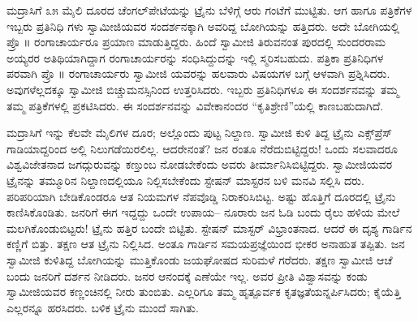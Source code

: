 ಮದ್ರಾಸಿಗೆ ೩೫ ಮೈಲಿ ದೂರದ ಚೆಂಗಲ್​ಪೇಟೆಯನ್ನು ಟ್ರೈನು ಬೆಳಿಗ್ಗೆ ಆರು ಗಂಟೆಗೆ ಮುಟ್ಟಿತು. ಆಗ  ಹಾಗೂ  ಪತ್ರಿಕೆಗಳ ಇಬ್ಬರು ಪ್ರತಿನಿಧಿ ಗಳು ಸ್ವಾಮೀಜಿಯವರ ಸಂದರ್ಶನಕ್ಕಾಗಿ ಅವರಿದ್ದ ಬೋಗಿಯನ್ನು ಹತ್ತಿದರು. ಅದೇ ಬೋಗಿಯಲ್ಲಿ ಪ್ರೊ ॥ ರಂಗಾಚಾರ್ಯರೂ ಪ್ರಯಾಣ ಮಾಡುತ್ತಿದ್ದರು. ಹಿಂದೆ ಸ್ವಾಮೀಜಿ ತಿರುವನಂತ ಪುರದಲ್ಲಿ ಸುಂದರರಾಮ ಅಯ್ಯರರ ಅತಿಥಿಯಾಗಿದ್ದಾಗ ರಂಗಾಚಾರ್ಯರನ್ನು ಸಂಧಿಸಿದ್ದುದನ್ನು ಇಲ್ಲಿ ಸ್ಮರಿಸಬಹುದು. ಪತ್ರಿಕಾ ಪ್ರತಿನಿಧಿಗಳ ಪರವಾಗಿ ಪ್ರೊ ॥ ರಂಗಾಚಾರ್ಯರು ಸ್ವಾಮೀಜಿ ಯವರನ್ನು ಹಲವಾರು ವಿಷಯಗಳ ಬಗ್ಗೆ ಆಳವಾಗಿ ಪ್ರಶ್ನಿಸಿದರು. ಅವುಗಳೆಲ್ಲದಕ್ಕೂ ಸ್ವಾಮೀಜಿ ಬಿಚ್ಚುಮನಸ್ಸಿನಿಂದ ಉತ್ತರಿಸಿದರು. ಇಬ್ಬರು ಪ್ರತಿನಿಧಿಗಳೂ ಈ ಸಂದರ್ಶನವನ್ನು ತಮ್ಮ ತಮ್ಮ ಪತ್ರಿಕೆಗಳಲ್ಲಿ ಪ್ರಕಟಿಸಿದರು. ಈ ಸಂದರ್ಶನವನ್ನು ವಿವೇಕಾನಂದರ “ಕೃತಿಶ್ರೇಣಿ”ಯಲ್ಲಿ ಕಾಣಬಹುದಾಗಿದೆ.

ಮದ್ರಾಸಿಗೆ ಇನ್ನು ಕೆಲವೇ ಮೈಲಿಗಳ ದೂರ; ಅಲ್ಲೊಂದು ಪುಟ್ಟ ನಿಲ್ದಾಣ. ಸ್ವಾಮೀಜಿ ಕುಳಿ ತಿದ್ದ ಟ್ರೈನು ಎಕ್ಸ್​ಪ್ರೆಸ್ ಗಾಡಿಯಾದ್ದರಿಂದ ಅಲ್ಲಿ ನಿಲುಗಡೆಯಿರಲಿಲ್ಲ. ಆದರೇನಂತೆ? ಜನ ರಂತೂ ನೆರೆದುಬಿಟ್ಟಿದ್ದರು! ಒಂದು ಸಲವಾದರೂ ವಿಶ್ವವಿಜೇತನಾದ ಜಗದ್ಗುರುವನ್ನು ಕಣ್ತುಂಬ ನೋಡಬೇಕೆಂದು ಅವರು ತೀರ್ಮಾನಿಸಿಬಿಟ್ಟಿದ್ದರು. ಸ್ವಾಮೀಜಿಯವರ ಟ್ರೈನನ್ನು ತಮ್ಮೂರಿನ ನಿಲ್ದಾಣದಲ್ಲಿಯೂ ನಿಲ್ಲಿಸಬೇಕೆಂದು ಸ್ಟೇಷನ್ ಮಾಸ್ಟರನ ಬಳಿ ಮನವಿ ಸಲ್ಲಿಸಿ ದರು. ಪರಿಪರಿಯಾಗಿ ಬೇಡಿಕೊಂಡರೂ ಆತ ನಿಯಮಗಳ ನೆಪವೊಡ್ಡಿ ನಿರಾಕರಿಸಿಬಿಟ್ಟ. ಅಷ್ಟು ಹೊತ್ತಿಗೆ ದೂರದಲ್ಲಿ ಟ್ರೈನು ಕಾಣಿಸಿಕೊಂಡಿತು. ಜನರಿಗೆ ಈಗ ಇದ್ದದ್ದು ಒಂದೇ ಉಪಾಯ– ನೂರಾರು ಜನ ಓಡಿ ಬಂದು ರೈಲು ಹಳಿಯ ಮೇಲೆ ಮಲಗಿಕೊಂಡುಬಿಟ್ಟರು! ಟ್ರೈನು ಹತ್ತಿರ ಬಂದೇ ಬಿಟ್ಟಿತು. ಸ್ಟೇಷನ್ ಮಾಸ್ಟರ್ ವಿಭ್ರಾಂತನಾದ. ಆದರೆ ಈ ದೃಶ್ಯ ಗಾರ್ಡಿನ ಕಣ್ಣಿಗೆ ಬಿತ್ತು. ತಕ್ಷಣ ಆತ ಟ್ರೈನು ನಿಲ್ಲಿಸಿದ. ಅಂತೂ ಗಾರ್ಡಿನ ಸಮಯಪ್ರಜ್ಞೆಯಿಂದ ಭೀಕರ ಅನಾಹುತ ತಪ್ಪಿತು. ಜನ ಸ್ವಾಮೀಜಿ ಕುಳಿತಿದ್ದ ಬೋಗಿಯನ್ನು ಮುತ್ತಿಕೊಂಡು ಜಯಘೋಷದ ಸುರಿಮಳೆ ಗರೆದರು. ತಕ್ಷಣ ಸ್ವಾಮೀಜಿ ಆಚೆ ಬಂದು ಜನರಿಗೆ ದರ್ಶನ ನೀಡಿದರು. ಜನರ ಆನಂದಕ್ಕೆ ಎಣೆಯೇ ಇಲ್ಲ. ಅವರ ಪ್ರೀತಿ ವಿಶ್ವಾಸವನ್ನು ಕಂಡು ಸ್ವಾಮೀಜಿಯವರ ಕಣ್ಣಂಚಿನಲ್ಲಿ ನೀರು ತುಂಬಿತು. ಎಲ್ಲರಿಗೂ ತಮ್ಮ ಹೃತ್ಪೂರ್ವಕ ಕೃತಜ್ಞತೆಯನ್ನರ್ಪಿಸಿದರು; ಕೈಯೆತ್ತಿ ಎಲ್ಲರನ್ನೂ ಹರಸಿದರು. ಬಳಿಕ ಟ್ರೈನು ಮುಂದೆ ಸಾಗಿತು.

